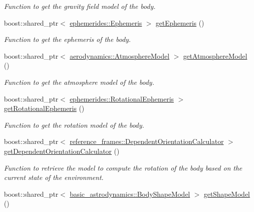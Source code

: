 \begin{DoxyCompactItemize}
\begin{DoxyCompactList}\small\item\em Function to get the gravity field model of the body. \end{DoxyCompactList}\item 
boost\+::shared\+\_\+ptr$<$ \hyperlink{classtudat_1_1ephemerides_1_1Ephemeris}{ephemerides\+::\+Ephemeris} $>$ \hyperlink{classtudat_1_1simulation__setup_1_1Body_a6df4ae46413f18304ec775ff430ffbea}{get\+Ephemeris} ()
\begin{DoxyCompactList}\small\item\em Function to get the ephemeris of the body. \end{DoxyCompactList}\item 
boost\+::shared\+\_\+ptr$<$ \hyperlink{classtudat_1_1aerodynamics_1_1AtmosphereModel}{aerodynamics\+::\+Atmosphere\+Model} $>$ \hyperlink{classtudat_1_1simulation__setup_1_1Body_ad655df1fe0eb22fcce46dcc0cd579c70}{get\+Atmosphere\+Model} ()
\begin{DoxyCompactList}\small\item\em Function to get the atmosphere model of the body. \end{DoxyCompactList}\item 
boost\+::shared\+\_\+ptr$<$ \hyperlink{classtudat_1_1ephemerides_1_1RotationalEphemeris}{ephemerides\+::\+Rotational\+Ephemeris} $>$ \hyperlink{classtudat_1_1simulation__setup_1_1Body_ad7f9739ae689c56a6e1c4903bcdcc7f0}{get\+Rotational\+Ephemeris} ()
\begin{DoxyCompactList}\small\item\em Function to get the rotation model of the body. \end{DoxyCompactList}\item 
boost\+::shared\+\_\+ptr$<$ \hyperlink{classtudat_1_1reference__frames_1_1DependentOrientationCalculator}{reference\+\_\+frames\+::\+Dependent\+Orientation\+Calculator} $>$ \hyperlink{classtudat_1_1simulation__setup_1_1Body_a449bb506aa309e75f20429d0d285697e}{get\+Dependent\+Orientation\+Calculator} ()
\begin{DoxyCompactList}\small\item\em Function to retrieve the model to compute the rotation of the body based on the current state of the environment. \end{DoxyCompactList}\item 
boost\+::shared\+\_\+ptr$<$ \hyperlink{classtudat_1_1basic__astrodynamics_1_1BodyShapeModel}{basic\+\_\+astrodynamics\+::\+Body\+Shape\+Model} $>$ \hyperlink{classtudat_1_1simulation__setup_1_1Body_afbb63724c2b0d7453475bf1c186793dc}{get\+Shape\+Model} ()

\end{DoxyCompactItemize}
